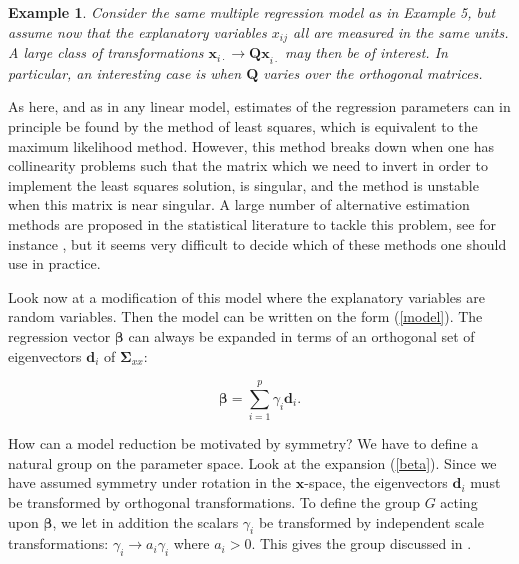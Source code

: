 \documentclass[a4paper, 11pt]{article}
\newtheorem{example}{Example}
\begin{document}
\smallskip

\begin{example}
  Consider the same multiple regression model as in Example 5, but assume now that the explanatory variables $x_{ij}$ all are measured in the same units. A large class of transformations $\bm{x}_{i\cdot}\rightarrow \bm{Qx}_{i\cdot}$ may then be of interest. In particular, an interesting case is when $\bm{Q}$ varies over the orthogonal matrices.
\end{example}

\smallskip

As here, and as in any linear model, estimates of the regression parameters can in principle be found by the method of least squares, which is equivalent to
the maximum likelihood method. However, this method breaks down when one has collinearity problems such that the matrix which we need to invert in order to implement the least squares solution, is singular, and the method is unstable when this matrix is near singular. A large number of alternative estimation methods are proposed in the statistical literature to tackle this problem, see for instance \citet{hastie2009elements}, but it seems very difficult to decide which of these methods one should use in practice.

Look now at a modification of this model where the explanatory variables are random variables. Then the model can be written on the form (\ref{model}).  The regression vector $\bm{\beta}$ can always be expanded in terms of an orthogonal set of eigenvectors $\bm{d}_i$ of $\bm{\Sigma}_{xx}$:

\begin{equation}
  \bm{\beta}=\sum_{i=1}^p \gamma_i \bm{d}_i .
  \label{beta}
\end{equation}

How can a model reduction be motivated by symmetry? We have to define a natural group on the parameter space. Look at the expansion (\ref{beta}). Since we have assumed symmetry under rotation in the $\bm{x}$-space, the eigenvectors $\bm{d}_i$ must be transformed by orthogonal transformations. To define the group $G$ acting upon $\bm{\beta}$, we let in addition the scalars $\gamma_i$ be transformed by independent scale transformations: $\gamma_i \rightarrow a_i \gamma_i$ where $a_i >0$. This gives the group discussed in \citet{helland2012near}.
\end{document}
